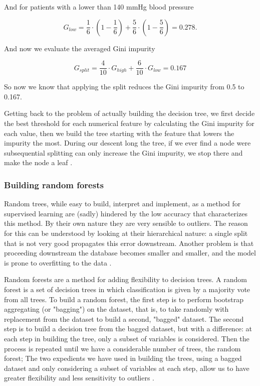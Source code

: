 \documentclass[a4paper]{report}
\begin{document}
And for patients with a lower than 140 mmHg blood pressure

\begin{equation}
    G_{low} = \frac{1}{6} \cdot (1 - \frac{1}{6}) + \frac{5}{6} \cdot (1- \frac{5}{6}) = 0.278.
\end{equation}

And now we evaluate the averaged Gini impurity

\begin{equation}
    G_{split} = \frac{4}{10} \cdot G_{high} + \frac{6}{10} \cdot G_{low} = 0.167
\end{equation}

So now we know that applying the split reduces the Gini impurity from 0.5 to 0.167.

Getting back to the problem of actually building the decision tree, we first decide the best threshold for each numerical feature by calculating the Gini impurity for each value, then we build the tree starting with the feature that lowers the impurity the most.
During our descent long the tree, if we ever find a node were subsequential splitting can only increase the Gini impurity, we stop there and make the node a leaf \cite{breiman2001random}.

\subsubsection{Building random forests}
Random trees, while easy to build, interpret and implement, as a method for supervised learning are (sadly) hindered by the low accuracy that characterizes this method.
By their own nature they are very sensible to outliers. The reason for this can be understood by looking at their hierarchical nature: a single split that is not very good propagates this error downstream.
Another problem is that proceeding downstream the database becomes smaller and smaller, and the model is prone to overfitting to the data \cite{bramer2007avoiding}.

Random forests are a method for adding flexibility to decision trees.
A random forest is a set of decision trees in which classification is given by a majority vote from all trees.
To build a random forest, the first step is to perform bootstrap aggregating (or "bagging") on the dataset, that is, to take randomly with replacement from the dataset to build a second, "bagged" dataset.
The second step is to build a decision tree from the bagged dataset, but with a difference:
at each step in building the tree, only a subset of variables is considered.
Then the process is repeated until we have a considerable number of trees, the random forest;
The two expedients we have used in building the trees, using a bagged dataset and only considering a subset of variables at each step, allow us to have greater flexibility and less sensitivity to outliers \cite{hastie2001data}.
\end{document}
